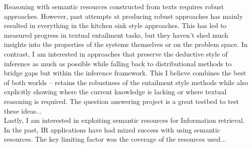 \documentclass[a4paper,11pt,onecolumn]{article}
\begin{document}
Reasoning with semantic resources constructed from texts requires robust approaches. However, past attempts at producing robust approaches has mainly resulted in everything in the kitchen sink style approaches. This has led to measured progress in textual entailment tasks, but they haven't shed much insights into the properties of the systems themselves or on the problem space. In contrast, I am interested in approaches that preserve the deductive style of inference as much as possible while falling back to distributional methods to bridge gaps but within the inference framework. This I believe combines the best of both worlds -- retains the robustness of the entailment style methods while also explicitly showing where the current knowledge is lacking or where textual reasoning is required. The question answering project is a great testbed to test these ideas...\\

Lastly, I am interested in exploiting semantic resources for Information retrieval. In the past, IR applications have had mixed success with using semantic resources. The key limiting factor was the coverage of the resources used...\\

{\small


}
\end{document}
